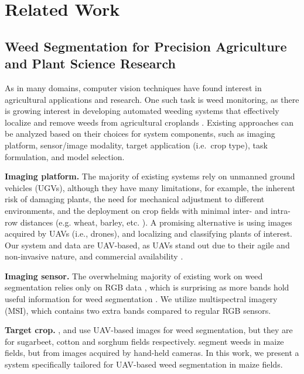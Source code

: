\section{Related Work}
\label{sec:related_work}

\subsection{Weed Segmentation for Precision Agriculture and Plant Science Research}

As in many domains, computer vision techniques have found interest in agricultural applications and research. One such task is weed monitoring, as there is growing interest in developing automated weeding systems that effectively localize and remove weeds from agricultural croplands \cite{Champ20aps, https://doi.org/10.1002/rob.21938, DENG2024102546}.
Existing approaches can be analyzed based on their choices for system components, such as imaging platform, sensor/image modality, target application (i.e.~crop type), task formulation, and model selection.  

\noindent \textbf{Imaging platform.}
The majority of existing systems rely on unmanned ground vehicles (UGVs), although they have many limitations,
for example, the inherent risk of damaging plants, the need for mechanical adjustment to different environments, and the deployment on crop fields with minimal inter- and intra-row distances (e.g. wheat, barley, etc. \cite{DEVITA201769, BOSTROM2012144}).
A promising alternative is using images acquired by UAVs (i.e., drones), and localizing and classifying plants of interest.
Our system and data are UAV-based, as UAVs stand out due to their agile and non-invasive nature, and commercial availability \cite{9705188, 8239328}.


\noindent \textbf{Imaging sensor.} The overwhelming majority of existing work on weed segmentation relies only on RGB data \cite{GENZE2022107388, weyler2023phenobench, Steininger_2023_WACV, app10207132}, which is surprising as more bands hold useful information for weed segmentation \cite{9081915, milioto2018real}. We utilize multispectral imagery (MSI), which contains two extra bands compared to regular RGB sensors. 

\noindent \textbf{Target crop.} \cite{weyler2023phenobench, Sa2018}, \cite{KRESTENITIS2022108575} and \cite{Genze2023} use UAV-based images for weed segmentation, but they are for sugarbeet, cotton and sorghum fields respectively. \cite{agronomy13071846, Steininger_2023_WACV} segment weeds in maize fields, but from images acquired by hand-held cameras. In this work, we present a system specifically tailored for UAV-based weed segmentation in maize fields.

